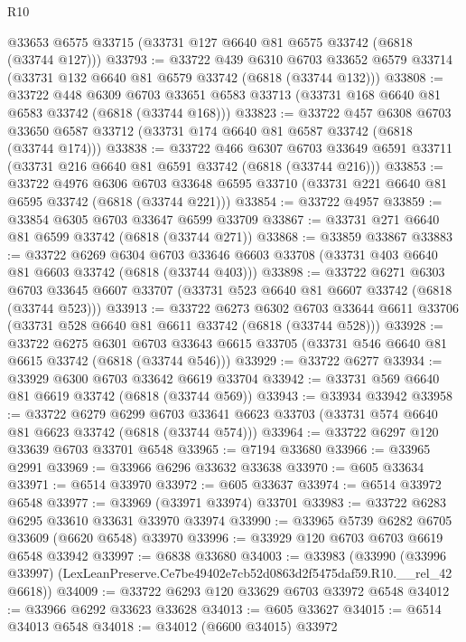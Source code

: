 \begin{lexlean}{R10}
\begin{coremodule}
    @33653
    @6575
    @33715
    (@33731 @127 @6640 @81 @6575 @33742 (@6818 (@33744 @127)))
@33793 := @33722
    @439
    @6310
    @6703
    @33652
    @6579
    @33714
    (@33731 @132 @6640 @81 @6579 @33742 (@6818 (@33744 @132)))
@33808 := @33722
    @448
    @6309
    @6703
    @33651
    @6583
    @33713
    (@33731 @168 @6640 @81 @6583 @33742 (@6818 (@33744 @168)))
@33823 := @33722
    @457
    @6308
    @6703
    @33650
    @6587
    @33712
    (@33731 @174 @6640 @81 @6587 @33742 (@6818 (@33744 @174)))
@33838 := @33722
    @466
    @6307
    @6703
    @33649
    @6591
    @33711
    (@33731 @216 @6640 @81 @6591 @33742 (@6818 (@33744 @216)))
@33853 := @33722
    @4976
    @6306
    @6703
    @33648
    @6595
    @33710
    (@33731 @221 @6640 @81 @6595 @33742 (@6818 (@33744 @221)))
@33854 := @33722 @4957
@33859 := @33854 @6305 @6703 @33647 @6599 @33709
@33867 := @33731 @271 @6640 @81 @6599 @33742 (@6818 (@33744 @271))
@33868 := @33859 @33867
@33883 := @33722
    @6269
    @6304
    @6703
    @33646
    @6603
    @33708
    (@33731 @403 @6640 @81 @6603 @33742 (@6818 (@33744 @403)))
@33898 := @33722
    @6271
    @6303
    @6703
    @33645
    @6607
    @33707
    (@33731 @523 @6640 @81 @6607 @33742 (@6818 (@33744 @523)))
@33913 := @33722
    @6273
    @6302
    @6703
    @33644
    @6611
    @33706
    (@33731 @528 @6640 @81 @6611 @33742 (@6818 (@33744 @528)))
@33928 := @33722
    @6275
    @6301
    @6703
    @33643
    @6615
    @33705
    (@33731 @546 @6640 @81 @6615 @33742 (@6818 (@33744 @546)))
@33929 := @33722 @6277
@33934 := @33929 @6300 @6703 @33642 @6619 @33704
@33942 := @33731 @569 @6640 @81 @6619 @33742 (@6818 (@33744 @569))
@33943 := @33934 @33942
@33958 := @33722
    @6279
    @6299
    @6703
    @33641
    @6623
    @33703
    (@33731 @574 @6640 @81 @6623 @33742 (@6818 (@33744 @574)))
@33964 := @33722 @6297 @120 @33639 @6703 @33701 @6548
@33965 := @7194 @33680
@33966 := @33965 @2991
@33969 := @33966 @6296 @33632 @33638
@33970 := @605 @33634
@33971 := @6514 @33970
@33972 := @605 @33637
@33974 := @6514 @33972 @6548
@33977 := @33969 (@33971 @33974) @33701
@33983 := @33722 @6283 @6295 @33610 @33631 @33970 @33974
@33990 := @33965 @5739 @6282 @6705 @33609 (@6620 @6548) @33970
@33996 := @33929 @120 @6703 @6703 @6619 @6548 @33942
@33997 := @6838 @33680
@34003 := @33983
    (@33990 (@33996 @33997) (LexLeanPreserve.Ce7be49402e7cb52d0863d2f5475daf59.R10.__rel_42 @6618))
@34009 := @33722 @6293 @120 @33629 @6703 @33972 @6548
@34012 := @33966 @6292 @33623 @33628
@34013 := @605 @33627
@34015 := @6514 @34013 @6548
@34018 := @34012 (@6600 @34015) @33972

\end{coremodule}
\end{lexlean}
